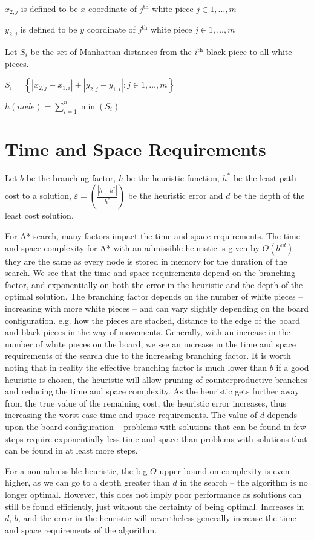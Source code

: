 \documentclass[a4paper,11pt]{article}
\begin{document}
$x_{2,j}$  is defined to be $x$ coordinate of $j^{\text{th}}$ white piece $j \in {1,\dots,m}$

$y_{2,j}$  is defined to be $y$ coordinate of $j^{\text{th}}$ white piece $j \in {1,\dots,m}$

Let $S_i$ be the set of Manhattan distances from the $i^{\text{th}}$ black piece to all white pieces.

$S_i = \left\{\left| x_{2,j} - x_{1,i}\right| + \left| y_{2,j} - y_{1,i}\right| :j \in 1,\dots,m\right\}$

$h(node) = \displaystyle\sum_{i=1}^n{\min\left(S_i\right)}$

\section*{Time and Space Requirements}
Let $b$ be the branching factor, $h$ be the heuristic function, $h^*$ be the least
path cost to a solution, $\varepsilon = \left(\frac{\left|h-h^* \right|}{h^*}\right)$ 
be the heuristic error and $d$ be the depth of the least cost solution.

For A* search, many factors impact the time and space requirements. 
The time and space complexity for A* with an 
admissible heuristic is given by $O(b^{\varepsilon d})$ -- they are the 
same as every node is stored in memory for the duration of the search. 
We see that the time and space requirements depend on the branching factor, and exponentially on
both the error in the heuristic and the depth of the optimal solution.
The branching factor depends on the number of white pieces -- increasing with more white pieces -- and can vary slightly depending on the board configuration. 
e.g. how the pieces are stacked, distance to the edge of the board and black pieces in the way of movements. 
Generally, with an increase in the number of white pieces on the board, we see
an increase in the time and space requirements of the search due to the increasing branching factor.
It is worth noting that in reality the effective branching factor is much lower
than $b$ if a good heuristic is chosen, the heuristic will allow pruning of counterproductive branches and 
reducing the time and space complexity. 
As the heuristic gets further away from the true value of the remaining cost, the heuristic error increases, 
thus increasing the worst case time and space requirements.
The value of $d$ depends upon the board configuration -- problems with solutions 
that can be found in few steps require exponentially less time and space 
than problems with solutions that can be found in at least more steps.

For a non-admissible heuristic, the big $O$ upper bound on complexity is 
even higher, as we can go to a depth greater than $d$ in the search --
the algorithm is no longer optimal. However, this does not imply poor 
performance as solutions can still be found efficiently, just without
the certainty of being optimal. Increases in $d$, $b$, and the error 
in the heuristic will nevertheless generally increase the time and space 
requirements of the algorithm.
\end{document}
